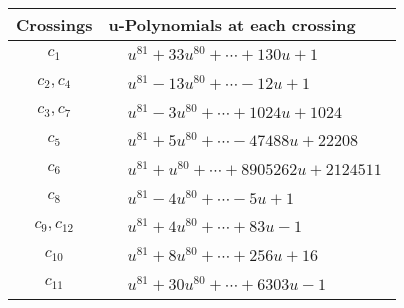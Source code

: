 \documentclass[1p]{elsarticle_modified}
\theoremstyle{definition}
\begin{document}
\begin{tabular}{m{50pt}|m{274pt}}
Crossings & \hspace{64pt}u-Polynomials at each crossing \\
\hline $$\begin{aligned}c_{1}\end{aligned}$$&$\begin{aligned}
&u^{81}+33 u^{80}+\cdots+130 u+1
\end{aligned}$\\
\hline $$\begin{aligned}c_{2},c_{4}\end{aligned}$$&$\begin{aligned}
&u^{81}-13 u^{80}+\cdots-12 u+1
\end{aligned}$\\
\hline $$\begin{aligned}c_{3},c_{7}\end{aligned}$$&$\begin{aligned}
&u^{81}-3 u^{80}+\cdots+1024 u+1024
\end{aligned}$\\
\hline $$\begin{aligned}c_{5}\end{aligned}$$&$\begin{aligned}
&u^{81}+5 u^{80}+\cdots-47488 u+22208
\end{aligned}$\\
\hline $$\begin{aligned}c_{6}\end{aligned}$$&$\begin{aligned}
&u^{81}+u^{80}+\cdots+8905262 u+2124511
\end{aligned}$\\
\hline $$\begin{aligned}c_{8}\end{aligned}$$&$\begin{aligned}
&u^{81}-4 u^{80}+\cdots-5 u+1
\end{aligned}$\\
\hline $$\begin{aligned}c_{9},c_{12}\end{aligned}$$&$\begin{aligned}
&u^{81}+4 u^{80}+\cdots+83 u-1
\end{aligned}$\\
\hline $$\begin{aligned}c_{10}\end{aligned}$$&$\begin{aligned}
&u^{81}+8 u^{80}+\cdots+256 u+16
\end{aligned}$\\
\hline $$\begin{aligned}c_{11}\end{aligned}$$&$\begin{aligned}
&u^{81}+30 u^{80}+\cdots+6303 u-1
\end{aligned}$\\
\hline
\end{tabular}\\~\\
\end{document}
